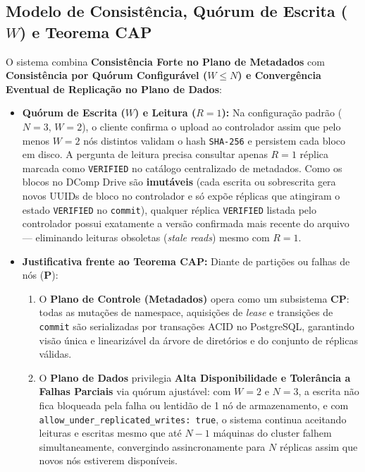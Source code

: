 \documentclass[10pt,a4paper]{article}
\begin{document}
\subsection{Modelo de Consistência, Quórum de Escrita (\texorpdfstring{$W$}{W}) e Teorema CAP}
O sistema combina \textbf{Consistência Forte no Plano de Metadados} com \textbf{Consistência por Quórum Configurável ($W \le N$) e Convergência Eventual de Replicação no Plano de Dados}:
\begin{itemize}
    \item \textbf{Quórum de Escrita ($W$) e Leitura ($R = 1$):} Na configuração padrão ($N = 3$, $W = 2$), o cliente confirma o upload ao controlador assim que pelo menos $W = 2$ nós distintos validam o hash \texttt{SHA-256} e persistem cada bloco em disco. A pergunta de leitura precisa consultar apenas $R = 1$ réplica marcada como \texttt{VERIFIED} no catálogo centralizado de metadados. Como os blocos no DComp Drive são \textbf{imutáveis} (cada escrita ou sobrescrita gera novos UUIDs de bloco no controlador e só expõe réplicas que atingiram o estado \texttt{VERIFIED} no \texttt{commit}), qualquer réplica \texttt{VERIFIED} listada pelo controlador possui exatamente a versão confirmada mais recente do arquivo — eliminando leituras obsoletas (\textit{stale reads}) mesmo com $R = 1$.
    \item \textbf{Justificativa frente ao Teorema CAP:} Diante de partições ou falhas de nós (\textbf{P}):
    \begin{enumerate}
        \item O \textbf{Plano de Controle (Metadados)} opera como um subsistema \textbf{CP}: todas as mutações de namespace, aquisições de \textit{lease} e transições de \texttt{commit} são serializadas por transações ACID no PostgreSQL, garantindo visão única e linearizável da árvore de diretórios e do conjunto de réplicas válidas.
        \item O \textbf{Plano de Dados} privilegia \textbf{Alta Disponibilidade e Tolerância a Falhas Parciais} via quórum ajustável: com $W = 2$ e $N = 3$, a escrita não fica bloqueada pela falha ou lentidão de 1 nó de armazenamento, e com \texttt{allow\_under\_replicated\_writes: true}, o sistema continua aceitando leituras e escritas mesmo que até $N - 1$ máquinas do cluster falhem simultaneamente, convergindo assincronamente para $N$ réplicas assim que novos nós estiverem disponíveis.
    \end{enumerate}
\end{itemize}
\end{document}
